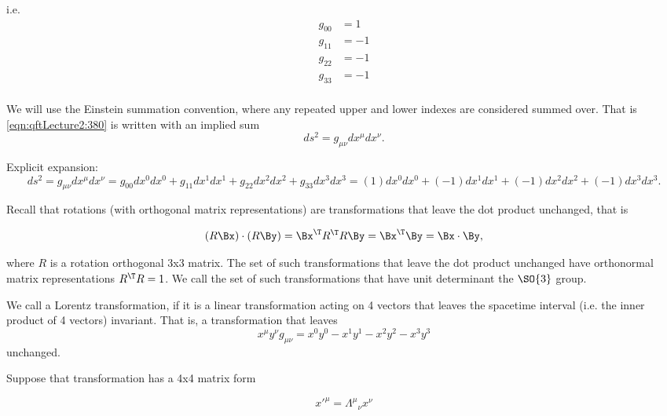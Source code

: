 i.e.
\begin{dmath}\label{eqn:qftLecture2:420}
\begin{aligned}
g_{00} &= 1 \\
g_{11} &= -1 \\
g_{22} &= -1 \\
g_{33} &= -1 \\
\end{aligned}
\end{dmath}

We will use the Einstein summation convention, where any repeated upper and lower indexes are considered summed over.  That is \cref{eqn:qftLecture2:380} is written with an implied sum
\begin{dmath}\label{eqn:qftLecture2:440}
ds^2 = g_{\mu\nu} dx^\mu dx^\nu.
\end{dmath}

Explicit expansion:
\begin{dmath}\label{eqn:qftLecture2:460}
ds^2 = g_{\mu\nu} dx^\mu dx^\nu
=
g_{00} dx^0 dx^0
+g_{11} dx^1 dx^1
+g_{22} dx^2 dx^2
+g_{33} dx^3 dx^3
=
(1) dx^0 dx^0
+ (-1) dx^1 dx^1
+ (-1) dx^2 dx^2
+ (-1) dx^3 dx^3.
\end{dmath}

Recall that rotations (with orthogonal matrix representations) are transformations that leave the dot product unchanged, that is

\begin{dmath}\label{eqn:qftLecture2:480}
(R \Bx) \cdot (R \By)
= \Bx^\T R^\T R \By
= \Bx^\T \By
= \Bx \cdot \By,
\end{dmath}

where \( R \) is a rotation orthogonal 3x3 matrix.  The set of such transformations that leave the dot product unchanged have orthonormal matrix representations \( R^\T R = 1 \).  We call the set of such transformations that have unit determinant the \(\SO{3}\) group.

We call a Lorentz transformation, if it is a linear transformation acting on 4 vectors that leaves the spacetime interval (i.e. the inner product of 4 vectors) invariant.  That is, a transformation that leaves
\begin{dmath}\label{eqn:qftLecture2:500}
x^\mu y^\nu g_{\mu\nu} = x^0 y^0 - x^1 y^1 - x^2 y^2 - x^3 y^3
\end{dmath}
unchanged.

Suppose that transformation has a 4x4 matrix form

\begin{dmath}\label{eqn:qftLecture2:520}
{x'}^\mu = {\Lambda^\mu}_\nu x^\nu
\end{dmath}

